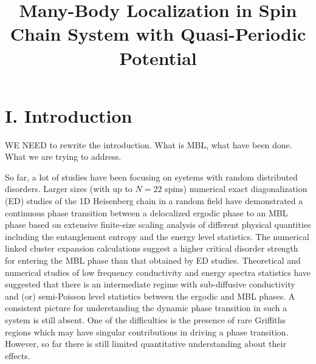 \documentclass[prl,aps,epsf,showpacs,twocolumn]{revtex4}
\begin{document}
\title{Many-Body Localization in Spin Chain System with Quasi-Periodic Potential}
\author{} 


\begin{abstract} 


\end{abstract}

\maketitle


\section{I.  Introduction}

WE NEED to rewrite  the introduction.   What is MBL,   what have been done.    What we are trying to address.





So far,   a lot of studies have been focusing on systems with random distributed disorders.  
Larger sizes (with up to $N=22$ spins) numerical  exact diagonalization (ED) studies\cite{luitz2015}  of
the 1D Heisenberg chain in a random field have  demonstrated a continuous  phase transition 
between a delocalized ergodic  phase  to an MBL  phase based on extensive finite-size scaling analysis
of different physical quantities including the  entanglement entropy  and  the energy level statistics.
The numerical linked cluster expansion calculations suggest a higher critical disorder strength  for entering the MBL phase\cite{devakul2015} 
  than that obtained by ED studies\cite{luitz2015}. 
Theoretical\cite{vosk_theory2014}  and numerical  studies of low frequency conductivity\cite{agarwal2015, knap2015} and 
energy spectra statistics\cite{serbyn2015} have suggested that there is an intermediate regime  with sub-diffusive conductivity
and (or)  semi-Poisson level statistics  between the ergodic and MBL phases.
A consistent picture for understanding the dynamic  phase transition in such a system is still absent.
One of the  difficulties  is the presence of  rare Griffiths regions\cite{vosk_theory2014, potter2015trans, knap2015}
which may have  singular contributions in  driving a  phase transition. However, so far there is
still limited  quantitative understanding about  their effects.
\end{document}
